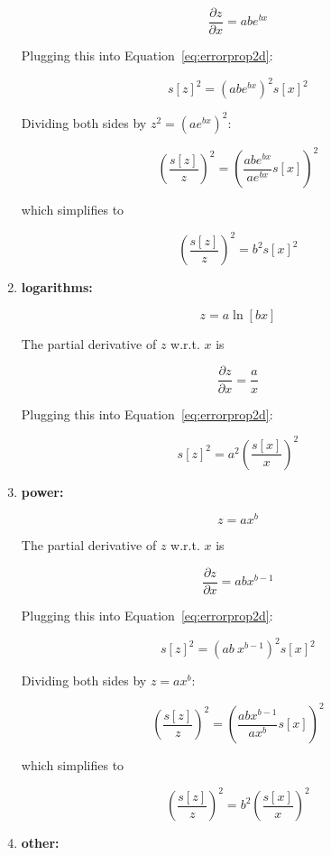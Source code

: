 \begin{enumerate}
  \[
  \frac{\partial z}{\partial x} = ab e^{bx}
  \]

  Plugging this into Equation~\ref{eq:errorprop2d}:

  \[
  s[z]^2 = \left(ab e^{bx}\right)^2 s[x]^2
  \]

  Dividing both sides by $z^2 = \left(a e^{bx}\right)^2$:

  \[
  \left(\frac{s[z]}{z}\right)^2 =
  \left(\frac{ab e^{bx}}{a e^{bx}}s[x]\right)^2 
  \]

  which simplifies to

  \begin{equation}
    \left(\frac{s[z]}{z}\right)^2 = b^2 s[x]^2
    \label{eq:exponentiation}
  \end{equation}

\item{\bf logarithms:}

  \[
  z = a \ln[bx]
  \]

  The partial derivative of $z$ w.r.t. $x$ is

  \[
  \frac{\partial z}{\partial x} = \frac{a}{x}
  \]

  Plugging this into Equation~\ref{eq:errorprop2d}:

  \begin{equation}
    s[z]^2 = a^2 \left(\frac{s[x]}{x}\right)^2
    \label{eq:logarithms}
  \end{equation}

\item{\bf power:}

  \[
  z = a x^b
  \]

  The partial derivative of $z$ w.r.t. $x$ is

  \[
  \frac{\partial z}{\partial x} = ab x^{b-1}
  \]

  Plugging this into Equation~\ref{eq:errorprop2d}:

  \[
  s[z]^2 = \left(ab~x^{b-1}\right)^2 s[x]^2
  \]

  Dividing both sides by $z = a x^b$:

  \[
  \left(\frac{s[z]}{z}\right)^2 = \left(\frac{ab x^{b-1}}{a x^{b}}s[x]\right)^2 
  \]

  which simplifies to
  
  \begin{equation}
    \left(\frac{s[z]}{z}\right)^2 = b^2\left(\frac{s[x]}{x}\right)^2
    \label{eq:power}
  \end{equation}

\item{\bf other:}


\end{enumerate}
